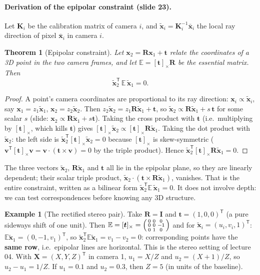 \documentclass[11pt,a4paper]{article}
\newcommand{\E}{\mathbb{E}}
\newcommand{\xt}{\tilde{\mathbf{x}}}
\newcommand{\xb}{\bar{\bm{x}}}
\newcommand{\sk}[1]{[#1]_{\times}}
\newcommand{\tr}{^{\mathsf T}}
\theoremstyle{definition}
\newtheorem{example}[definition]{Example}
\theoremstyle{plain}
\newtheorem{theorem}[definition]{Theorem}
\theoremstyle{remark}
\begin{document}
\paragraph{Derivation of the epipolar constraint (slide 23).}
Let $\bm K_i$ be the calibration matrix of camera $i$, and $\xt_i=\bm K_i^{-1}\xb_i$ the local ray direction of pixel $\xb_i$ in camera $i$.

\begin{theorem}[Epipolar constraint]\label{thm:epi}
Let $\bm x_2=\bm R\bm x_1+\bm t$ relate the coordinates of a 3D point in the two camera frames, and let $\E=\sk{\bm t}\bm R$ be the \emph{essential matrix}. Then
\[
\xt_2\tr\,\E\,\xt_1=0 .
\]
\end{theorem}
\begin{proof}
A point's camera coordinates are proportional to its ray direction: $\bm x_i\propto\xt_i$, say $\bm x_1=z_1\xt_1$, $\bm x_2=z_2\xt_2$. Then
$z_2\xt_2=z_1\bm R\xt_1+\bm t$, so $\xt_2\propto\bm R\xt_1+s\,\bm t$ for some scalar $s$ (slide: $\bm x_2\propto\bm R\xt_1+s\bm t$).
Taking the cross product with $\bm t$ (i.e.\ multiplying by $\sk{\bm t}$, which kills $\bm t$) gives $\sk{\bm t}\xt_2\propto\sk{\bm t}\bm R\xt_1$.
Taking the dot product with $\xt_2$: the left side is $\xt_2\tr\sk{\bm t}\xt_2=0$ because $\sk{\bm t}$ is skew-symmetric
($\bm v\tr\sk{\bm t}\bm v=\bm v\cdot(\bm t\times\bm v)=0$ by the triple product). Hence $\xt_2\tr\sk{\bm t}\bm R\xt_1=0$.
\end{proof}

\begin{intuition}
The three vectors $\xt_2$, $\bm R\xt_1$ and $\bm t$ all lie in the epipolar plane, so they are linearly dependent; their scalar triple product, $\xt_2\cdot(\bm t\times\bm R\xt_1)$, vanishes.
That is the entire constraint, written as a bilinear form $\xt_2\tr\E\,\xt_1=0$. It does not involve depth: we can test correspondences before knowing any 3D structure.
\end{intuition}

\begin{example}[The rectified stereo pair]\label{ex:rectified}
Take $\bm R=\bm I$ and $\bm t=(1,0,0)\tr$ (a pure sideways shift of one unit). Then
$\E=\sk{\bm t}=\begin{psmallmatrix}0&0&0\\0&0&-1\\0&1&0\end{psmallmatrix}$ and for $\xt_i=(u_i,v_i,1)\tr$:
$\E\xt_1=(0,-1,v_1)\tr$, so $\xt_2\tr\E\xt_1=v_1-v_2=0$: corresponding points have the \textbf{same row}, i.e.\ epipolar lines are horizontal.
This is the stereo setting of lecture 04. With $\bm X=(X,Y,Z)\tr$ in camera 1, $u_1=X/Z$ and $u_2=(X+1)/Z$, so $u_2-u_1=1/Z$. If $u_1=0.1$ and $u_2=0.3$, then $Z=5$ (in units of the baseline).
\end{example}
\end{document}
